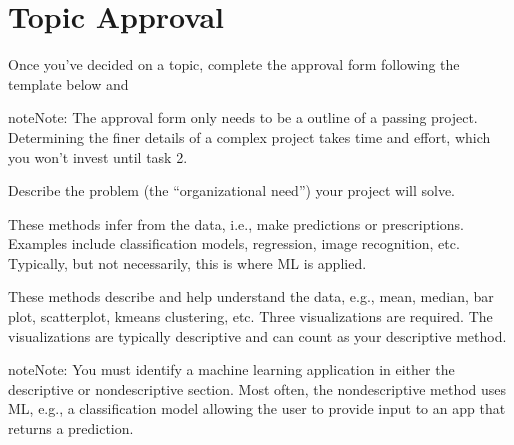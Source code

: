 \documentclass[letterpaper,10pt,english]{jupyterBook}
\begin{document}
\section{Topic Approval}
\label{\detokenize{task1:topic-approval}}\label{\detokenize{task1:task1-approval}}
\sphinxAtStartPar
Once you’ve decided on a topic, complete the approval form following the template below and 


\begin{quote}

\sphinxAtStartPar
{}
\end{quote}

\begin{sphinxadmonition}{note}{Note:}
\sphinxAtStartPar
The approval form only needs to be a  outline of a passing project.  Determining the finer details of a complex project takes time and effort, which you won’t invest until task 2.
\end{sphinxadmonition}

\sphinxAtStartPar
{} Describe the problem (the “organizational need”) your project will solve.

\sphinxAtStartPar
{}  These methods infer from the data, i.e., make predictions or prescriptions. Examples include classification models, regression, image recognition, etc. Typically, but not necessarily, this is where ML is applied.

\sphinxAtStartPar
{} These methods describe and help understand the data, e.g., mean, median, bar plot, scatterplot, k\sphinxhyphen{}means clustering, etc. Three visualizations are required. The visualizations are typically descriptive and can count as your descriptive method.

\begin{sphinxadmonition}{note}{Note:}
\sphinxAtStartPar
You must identify a machine learning application in either the descriptive or non\sphinxhyphen{}descriptive section. Most often, the non\sphinxhyphen{}descriptive method uses ML, e.g., a classification model allowing the user to provide input to an app that returns a prediction.
\end{sphinxadmonition}
\end{document}
